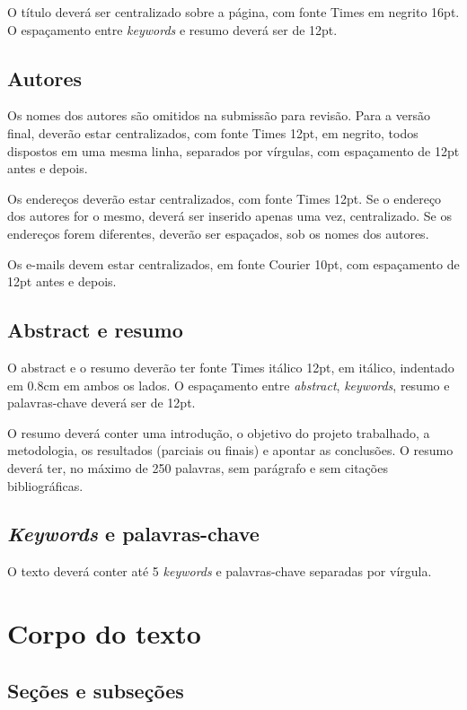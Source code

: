 \documentclass[12pt]{article}
\begin{document}
O título deverá ser centralizado sobre a página, com fonte Times em
negrito 16pt. O espaçamento entre \textit{keywords} e resumo deverá
ser de 12pt.

\subsection{Autores}
\label{sec:autores}

Os nomes dos autores são omitidos na submissão para revisão. Para a
versão final, deverão estar centralizados, com fonte Times 12pt, em
negrito, todos dispostos em uma mesma linha, separados por vírgulas,
com espaçamento de 12pt antes e depois.

Os endereços deverão estar centralizados, com fonte Times 12pt. Se o
endereço dos autores for o mesmo, deverá ser inserido apenas uma vez,
centralizado. Se os endereços forem diferentes, deverão ser espaçados,
sob os nomes dos autores.

Os e-mails devem estar centralizados, em fonte Courier 10pt, com
espaçamento de 12pt antes e depois.

\subsection{Abstract e resumo}
\label{sec:abstract-e-resumo}

O abstract e o resumo deverão ter fonte Times itálico 12pt, em
itálico, indentado em 0.8cm em ambos os lados. O espaçamento entre
\textit{abstract}, \textit{keywords}, resumo e palavras-chave deverá
ser de 12pt.

O resumo deverá conter uma introdução, o objetivo do projeto
trabalhado, a metodologia, os resultados (parciais ou finais) e
apontar as conclusões. O resumo deverá ter, no máximo de 250 palavras,
sem parágrafo e sem citações bibliográficas.

\subsection{\textit{Keywords} e palavras-chave}
\label{sec:keywords-e-palavras}

O texto deverá conter até 5 \textit{keywords} e palavras-chave
separadas por vírgula.

\section{Corpo do texto}

\subsection{Seções e subseções}
\label{sec:secoes}
\end{document}
